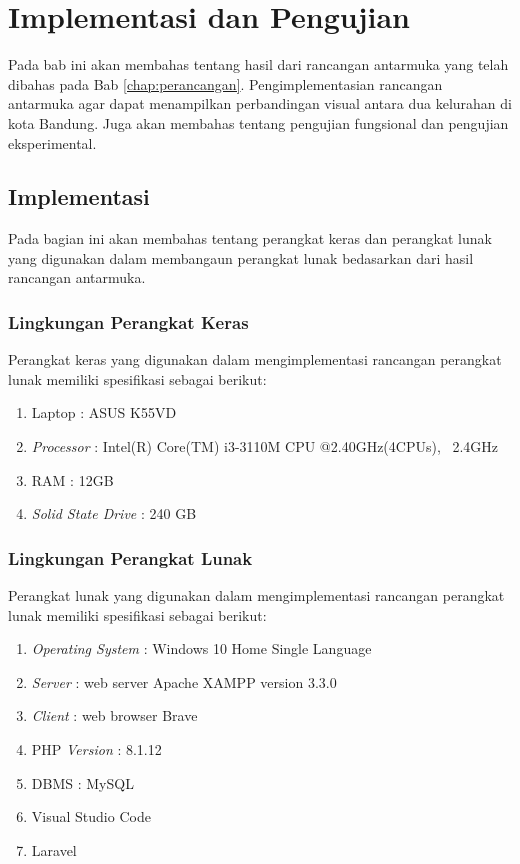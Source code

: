 \chapter{Implementasi dan Pengujian}

Pada bab ini akan membahas tentang hasil dari rancangan antarmuka yang telah dibahas pada Bab \ref{chap:perancangan}. Pengimplementasian rancangan antarmuka agar dapat menampilkan perbandingan visual antara dua kelurahan di kota Bandung. Juga akan membahas tentang pengujian fungsional dan pengujian eksperimental.

\section{Implementasi}
\label{sec:implementasi}

Pada bagian ini akan membahas tentang perangkat keras dan perangkat lunak yang digunakan dalam membangaun perangkat lunak bedasarkan dari hasil rancangan antarmuka.

\subsection{Lingkungan Perangkat Keras}
Perangkat keras yang digunakan dalam mengimplementasi rancangan perangkat lunak memiliki spesifikasi sebagai berikut:
\begin{enumerate}
	\item Laptop : ASUS K55VD
	\item \textit{Processor} : Intel(R) Core(TM) i3-3110M CPU @2.40GHz(4CPUs), ~2.4GHz 
	\item RAM : 12GB 
	\item \textit{Solid State Drive} : 240 GB
\end{enumerate}


\subsection{Lingkungan Perangkat Lunak}

Perangkat lunak yang digunakan dalam mengimplementasi rancangan perangkat lunak memiliki spesifikasi sebagai berikut:
\begin{enumerate}
	\item \textit{Operating System} : Windows 10 Home Single Language
	\item \textit{Server} : web server Apache XAMPP version 3.3.0
	\item \textit{Client} : web browser Brave
	\item PHP \textit{Version} : 8.1.12
	\item DBMS : MySQL
	\item Visual Studio Code
	\item Laravel
\end{enumerate}

